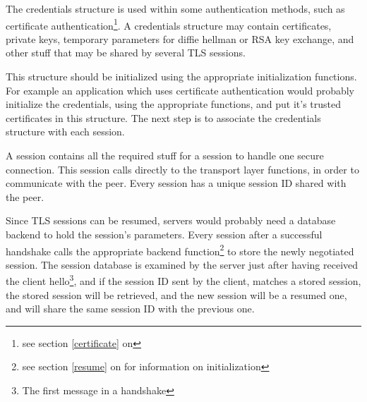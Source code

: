 \par
The credentials structure is used within some authentication methods,
such as certificate authentication\footnote{see section \ref{certificate} on \pageref{certificate}}.
A credentials structure may contain certificates, private keys, temporary parameters 
for diffie hellman or RSA key exchange, and other stuff that may be shared
by several TLS sessions. 

This structure should be initialized using the appropriate initialization
functions. For example an application which uses certificate authentication
would probably initialize the credentials, using the appropriate functions,
and put it's trusted certificates in this structure. The next step is to
associate the credentials structure with each \tls{} session.

\par A \gnutls{} session contains all the required stuff for a
session to handle one secure connection. This session calls directly
to the transport layer functions, in order to communicate with the peer.
Every session has a unique session ID shared with the peer.

\par
Since TLS sessions can be resumed, servers would probably need a database
backend to hold the session's parameters. Every \gnutls{} session after
a successful handshake calls the appropriate backend function\footnote{see section \ref{resume}
on \pageref{resume} for information on initialization} to store the
newly negotiated session. The session database is examined by the server
just after having received the client hello\footnote{The first message
in a \tls{} handshake}, and if the session ID sent by the client,
matches a stored session, the stored session will be retrieved, and the
new session will be a resumed one, and will share the same session ID
with the previous one.




